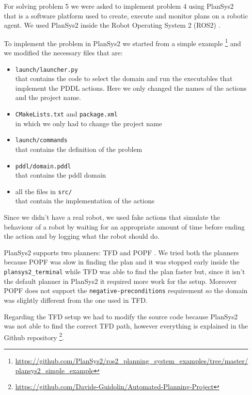 For solving problem 5 we were asked to implement problem 4 using PlanSys2 \cite{plansys2} that is a software platform used to create, execute and monitor plans on a robotic agent. We used PlanSys2 inside the 
Robot Operating System 2 (ROS2) \cite{ros2}.

To implement the problem in PlanSys2 we started from a simple example \footnote{\url{https://github.com/PlanSys2/ros2_planning_system_examples/tree/master/plansys2_simple_example}} and we modified the necessary files that are:
\begin{itemize}
    \item \verb+launch/launcher.py+ \\ 
    that contains the code to select the domain and run the executables that implement the PDDL actions. Here we only changed the names of the actions and the project name.
    \item \verb+CMakeLists.txt+ and \verb+package.xml+ \\
    in which we only had to change the project name
    \item \verb+launch/commands+ \\
    that contains the definition of the problem
    \item \verb+pddl/domain.pddl+ \\
    that contains the pddl domain
    \item all the files in \verb+src/+ \\
    that contain the implementation of the actions
\end{itemize}

Since we didn't have a real robot, we used fake actions that simulate the 
behaviour of a robot by waiting for an appropriate amount of time before ending the action and by logging what the robot should do.

PlanSys2 supports two planners: TFD \cite{tfd} and POPF \cite{popf}.
We tried both the planners because POPF was slow in finding the plan and it 
was stopped early inside the \verb+plansys2_terminal+ while TFD was able to find the plan faster but, since it isn't the default planner in PlanSys2 it required more work for the setup. Moreover POPF does not support the \verb+negative-preconditions+ requirement so the domain was slightly different from the one used in TFD.

Regarding the TFD setup we had to modify the source code because PlanSys2 was not able to find the correct TFD path, however everything is explained in the Github repository \footnote{\url{https://github.com/Davide-Guidolin/Automated-Planning-Project}}.